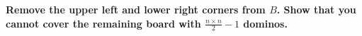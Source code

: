 \textbf{Remove the upper left and lower right corners from $B$. Show that you cannot cover the remaining board with $\frac{n \times n}{2}-1$ dominos.}\vspace{.2cm}

\textcolor{bibi}{}
\begin{quote}
\end{quote}